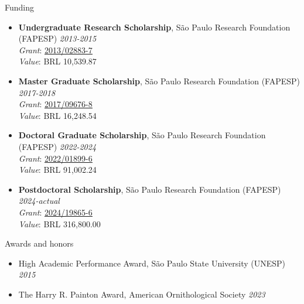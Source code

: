 \documentclass{resume}
\begin{document}

\begin{rSection}{Funding} 
\begin{itemize}
\item {\bf Undergraduate Research Scholarship}{, São Paulo Research Foundation (FAPESP)
} \hfill{\em 2013-2015}\\
{\it Grant}: \href{https://bv.fapesp.br/en/bolsas/142421/effect-of-fragmentation-on-the-persistence-of-anuran-amphibians-amphibia-anura-within-the-atlanti/}{\underline{2013/02883-7}}\\
{\it Value}: BRL 10,539.87

\item {\bf Master Graduate Scholarship}{, São Paulo Research Foundation (FAPESP)
} \hfill{\em 2017-2018}\\
{\it Grant}: \href{https://bv.fapesp.br/en/bolsas/172826/effect-of-landscape-modifications-and-climate-changes-on-the-persistence-of-amphibians-in-the-atlant/}{\underline{2017/09676-8}}\\
{\it Value}: BRL 16,248.54

\item {\bf Doctoral Graduate Scholarship}{, São Paulo Research Foundation (FAPESP)
} \hfill{\em 2022-2024}\\
{\it Grant}: \href{https://bv.fapesp.br/en/bolsas/203713/landscape-structure-as-a-predictor-of-taxonomic-and-functional-diversity-of-amphibians-in-the-atlant/}{\underline{2022/01899-6}}\\
{\it Value}: BRL 91,002.24

\item {\bf Postdoctoral Scholarship}{, São Paulo Research Foundation (FAPESP)
} \hfill{\em 2024-actual}\\
{\it Grant}: \href{https://bv.fapesp.br/en/bolsas/223203/impacts-of-edge-effects-fire-and-climate-change-on-vegetation-composition-and-functional-diversity-a/}{\underline{2024/19865-6}}\\
{\it Value}: BRL 316,800.00
\end{itemize}
\end{rSection}


\begin{rSection}{Awards and honors} 
\begin{itemize}
\item {High Academic Performance Award, São Paulo State University (UNESP)} \hfill{\em 2015}
\item {The Harry R. Painton Award, American Ornithological Society} \hfill{\em 2023}
\end{itemize}
\end{rSection}
\end{document}
